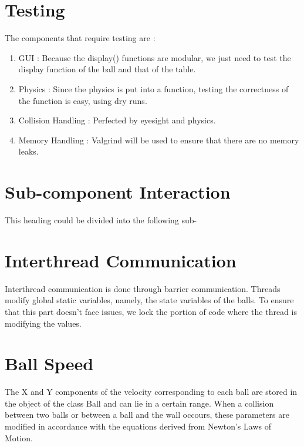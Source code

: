 \documentclass[]{article}
\begin{document}
\section{Testing}
The components that require testing are :
\begin{enumerate}
\item GUI : Because the display() functions are modular, we just need to test the display function of the ball and that of the table.
\item Physics : Since the physics is put into a function, testing the correctness of the function is easy, using dry runs.
\item Collision Handling : Perfected by eyesight and physics.
\item Memory Handling : Valgrind will be used to ensure that there are no memory leaks.
\end{enumerate}
\section{Sub-component Interaction}
\begin{flushleft}
This heading could be divided into the following sub-
\end{flushleft}

\section{Interthread Communication}
Interthread communication is done through barrier communication. Threads modify global static variables, namely, the state variables of the balls.
To ensure that this part doesn't face issues, we lock the portion of code where the thread is modifying the values.
\begin{flushleft}

\end{flushleft}
\section{Ball Speed}
\begin{flushleft}
The X and Y components of the velocity corresponding to each ball are stored in the  object of the class Ball and can lie in a certain range. When a collision between two balls or between a ball and the wall occours, these parameters are modified in accordance with the equations derived from Newton's Laws of Motion.  
\end{flushleft}
\end{document}
